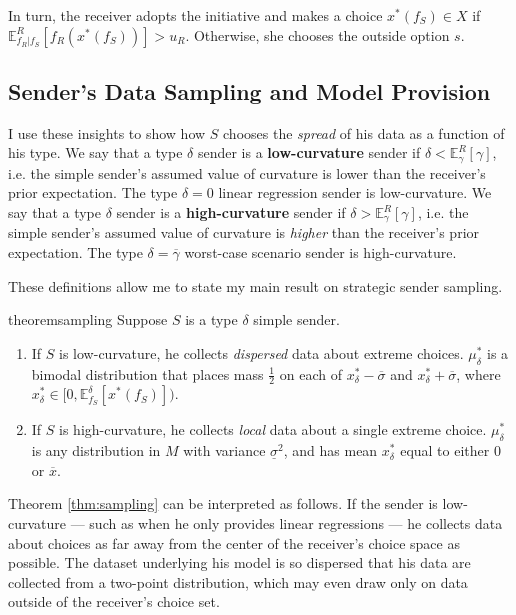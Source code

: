 \documentclass[11pt,dvipsnames]{article}
\begin{document}
In turn, the receiver adopts the initiative and makes a choice $x^*(f_S) \in X$ if $\mathbb{E}^R_{f_R|f_S}[f_R(x^*(f_S))] > u_R$.
Otherwise, she chooses the outside option $s$.

\subsection{Sender's Data Sampling and Model Provision}
I use these insights to show how $S$ chooses the \emph{spread} of his data as a function of his type.
We say that a type $\delta$ sender is a \textbf{low-curvature} sender if $\delta < \mathbb{E}_\gamma^R[\gamma]$, i.e. the simple sender's assumed value of curvature is lower than the receiver's prior expectation.
The type $\delta=0$ linear regression sender is low-curvature.
We say that a type $\delta$ sender is a \textbf{high-curvature} sender if $\delta > \mathbb{E}_\gamma^R[\gamma]$, i.e. the simple sender's assumed value of curvature is \emph{higher} than the receiver's prior expectation.
The type $\delta=\overline{\gamma}$ worst-case scenario sender is high-curvature.

These definitions allow me to state my main result on strategic sender sampling.
\begin{restatable}{theorem}{sampling}
Suppose $S$ is a type $\delta$ simple sender.
\begin{enumerate}
\item If $S$ is low-curvature, he collects \emph{dispersed} data about extreme choices. $\mu_\delta^*$ is a bimodal distribution that places mass $\frac{1}{2}$ on each of $x_\delta^*-\overline{\sigma}$ and $x_\delta^*+\overline{\sigma}$, where $x_\delta^* \in \big[0, \mathbb{E}_{f_S}^\delta[x^*(f_S)]\big)$. 
\item If $S$ is high-curvature, he collects \emph{local} data about a single extreme choice. $\mu_\delta^*$ is any distribution in $M$ with variance $\underline{\sigma}^2$, and has mean $x_\delta^*$ equal to either $0$ or $\overline{x}$.
\end{enumerate}
\label{thm:sampling}
\end{restatable}

Theorem \ref{thm:sampling} can be interpreted as follows.
If the sender is low-curvature --- such as when he only provides linear regressions --- he collects data about choices as far away from the center of the receiver's choice space as possible.
The dataset underlying his model is so dispersed that his data are collected from a two-point distribution, which may even draw only on data outside of the receiver's choice set.
\end{document}
